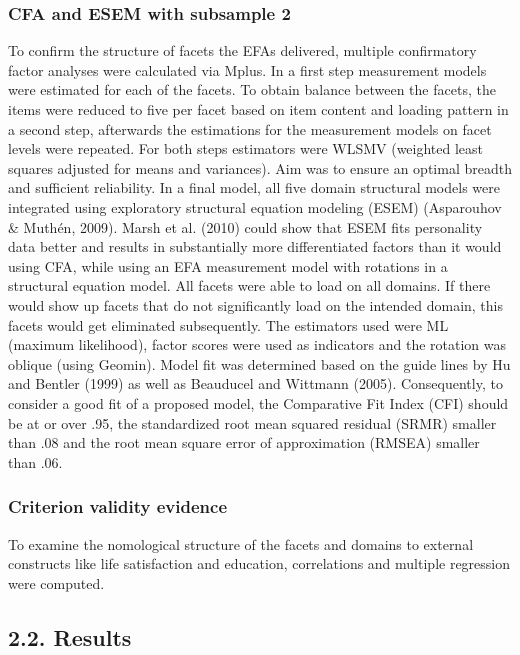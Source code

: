 \documentclass[,man]{apa6}
\theoremstyle{definition}
\theoremstyle{definition}
\theoremstyle{definition}
\theoremstyle{remark}
\begin{document}
\hypertarget{cfa-and-esem-with-subsample-2}{%
\subsubsection{CFA and ESEM with subsample
2}\label{cfa-and-esem-with-subsample-2}}

To confirm the structure of facets the EFAs delivered, multiple
confirmatory factor analyses were calculated via Mplus. In a first step
measurement models were estimated for each of the facets. To obtain
balance between the facets, the items were reduced to five per facet
based on item content and loading pattern in a second step, afterwards
the estimations for the measurement models on facet levels were
repeated. For both steps estimators were WLSMV (weighted least squares
adjusted for means and variances). Aim was to ensure an optimal breadth
and sufficient reliability. In a final model, all five domain structural
models were integrated using exploratory structural equation modeling
(ESEM) (Asparouhov \& Muthén, 2009). Marsh et al. (2010) could show that
ESEM fits personality data better and results in substantially more
differentiated factors than it would using CFA, while using an EFA
measurement model with rotations in a structural equation model. All
facets were able to load on all domains. If there would show up facets
that do not significantly load on the intended domain, this facets would
get eliminated subsequently. The estimators used were ML (maximum
likelihood), factor scores were used as indicators and the rotation was
oblique (using Geomin). Model fit was determined based on the guide
lines by Hu and Bentler (1999) as well as Beauducel and Wittmann (2005).
Consequently, to consider a good fit of a proposed model, the
Comparative Fit Index (CFI) should be at or over .95, the standardized
root mean squared residual (SRMR) smaller than .08 and the root mean
square error of approximation (RMSEA) smaller than .06.

\hypertarget{criterion-validity-evidence}{%
\subsubsection{Criterion validity
evidence}\label{criterion-validity-evidence}}

To examine the nomological structure of the facets and domains to
external constructs like life satisfaction and education, correlations
and multiple regression were computed.

\hypertarget{results}{%
\subsection{2.2. Results}\label{results}}
\end{document}
